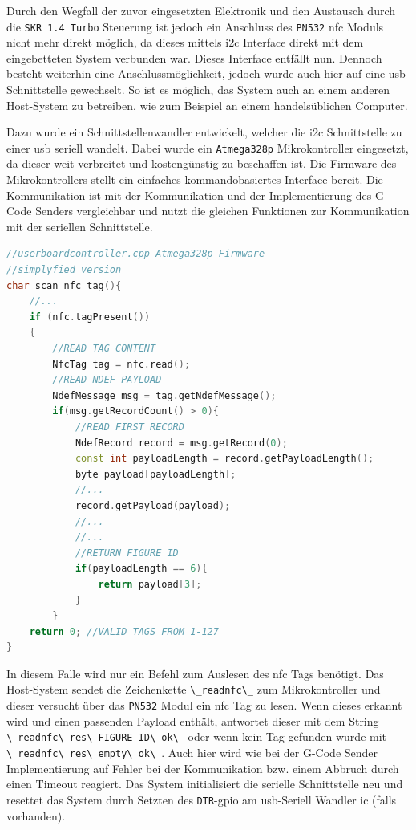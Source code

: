 Durch den Wegfall der zuvor eingesetzten Elektronik und den Austausch
durch die \passthrough{\lstinline!SKR 1.4 Turbo!} Steuerung ist jedoch
ein Anschluss des \passthrough{\lstinline!PN532!} \gls{nfc} Moduls nicht
mehr direkt möglich, da dieses mittels \gls{i2c} Interface direkt mit
dem eingebetteten System verbunden war. Dieses Interface entfällt nun.
Dennoch besteht weiterhin eine Anschlussmöglichkeit, jedoch wurde auch
hier auf eine \gls{usb} Schnittstelle gewechselt. So ist es möglich, das
System auch an einem anderen Host-System zu betreiben, wie zum Beispiel
an einem handelsüblichen Computer.

Dazu wurde ein Schnittstellenwandler entwickelt, welcher die \gls{i2c}
Schnittstelle zu einer \gls{usb} seriell wandelt. Dabei wurde ein
\passthrough{\lstinline!Atmega328p!} Mikrokontroller eingesetzt, da
dieser weit verbreitet und kostengünstig zu beschaffen ist. Die Firmware
des Mikrokontrollers stellt ein einfaches kommandobasiertes Interface
bereit. Die Kommunikation ist mit der Kommunikation und der
Implementierung des G-Code Senders vergleichbar und nutzt die gleichen
Funktionen zur Kommunikation mit der seriellen Schnittstelle.

\begin{lstlisting}[language={C++}]
//userboardcontroller.cpp Atmega328p Firmware
//simplyfied version
char scan_nfc_tag(){
    //...
    if (nfc.tagPresent())
    {
        //READ TAG CONTENT
        NfcTag tag = nfc.read();
        //READ NDEF PAYLOAD
        NdefMessage msg = tag.getNdefMessage();
        if(msg.getRecordCount() > 0){
            //READ FIRST RECORD
            NdefRecord record = msg.getRecord(0);
            const int payloadLength = record.getPayloadLength();
            byte payload[payloadLength];
            //...
            record.getPayload(payload);
            //...
            //...
            //RETURN FIGURE ID
            if(payloadLength == 6){
                return payload[3];
            }
        }
    return 0; //VALID TAGS FROM 1-127
}
\end{lstlisting}

In diesem Falle wird nur ein Befehl zum Auslesen des \gls{nfc} Tags
benötigt. Das Host-System sendet die Zeichenkette
\passthrough{\lstinline!\_readnfc\_!} zum Mikrokontroller und dieser
versucht über das \passthrough{\lstinline!PN532!} Modul ein \gls{nfc}
Tag zu lesen. Wenn dieses erkannt wird und einen passenden Payload
enthält, antwortet dieser mit dem String
\passthrough{\lstinline!\_readnfc\_res\_FIGURE-ID\_ok\_!} oder wenn kein
Tag gefunden wurde mit
\passthrough{\lstinline!\_readnfc\_res\_empty\_ok\_!}. Auch hier wird
wie bei der G-Code Sender Implementierung auf Fehler bei der
Kommunikation bzw. einem Abbruch durch einen Timeout reagiert. Das
System initialisiert die serielle Schnittstelle neu und resettet das
System durch Setzten des \passthrough{\lstinline!DTR!}-\gls{gpio} am
\gls{usb}-Seriell Wandler \gls{ic} (falls vorhanden).

